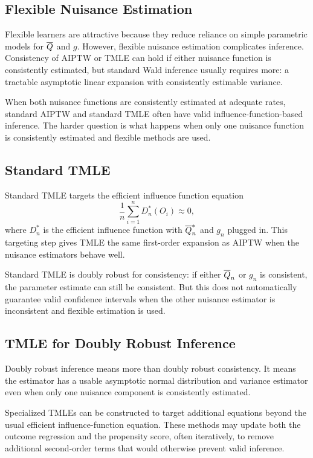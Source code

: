 \label{lec:7-8}

\subsection{Flexible Nuisance Estimation}

Flexible learners are attractive because they reduce reliance on simple parametric
models for $\overline{Q}$ and $g$. However, flexible nuisance estimation complicates
inference. Consistency of AIPTW or TMLE can hold if either nuisance function is
consistently estimated, but standard Wald inference usually requires more: a tractable
asymptotic linear expansion with consistently estimable variance.

When both nuisance functions are consistently estimated at adequate rates, standard
AIPTW and standard TMLE often have valid influence-function-based inference. The
harder question is what happens when only one nuisance function is consistently
estimated and flexible methods are used.

\subsection{Standard TMLE}

Standard TMLE targets the efficient influence function equation
\[
\frac{1}{n}\sum_{i=1}^nD_n^*(O_i)\approx 0,
\]
where $D_n^*$ is the efficient influence function with $\overline{Q}_n^*$ and $g_n$ plugged
in. This targeting step gives TMLE the same first-order expansion as AIPTW when the
nuisance estimators behave well.

Standard TMLE is doubly robust for consistency: if either $\overline{Q}_n$ or $g_n$ is
consistent, the parameter estimate can still be consistent. But this does not
automatically guarantee valid confidence intervals when the other nuisance estimator
is inconsistent and flexible estimation is used.

\subsection{TMLE for Doubly Robust Inference}

Doubly robust inference means more than doubly robust consistency. It means the
estimator has a usable asymptotic normal distribution and variance estimator even
when only one nuisance component is consistently estimated.

Specialized TMLEs can be constructed to target additional equations beyond the usual
efficient influence-function equation. These methods may update both the outcome
regression and the propensity score, often iteratively, to remove additional second-order
terms that would otherwise prevent valid inference.

